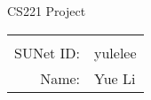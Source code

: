 \documentclass[12pt]{article}
\begin{document}
\begin{center}
{\Large CS221 Project}

\begin{tabular}{rl}
\newline
\\ 
SUNet ID: & yulelee \\
Name: & Yue Li \\
\end{tabular}
\end{center}
\end{document}
